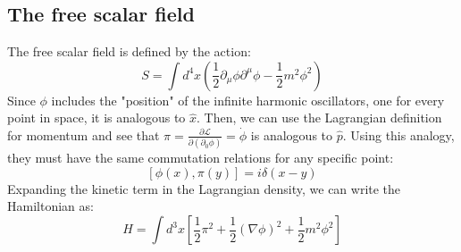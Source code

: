 \documentclass{article}
\begin{document}
\subsection{The free scalar field}
The free scalar field is defined by the action:
\begin{equation}
    S = \int d^4x \left(\frac{1}{2}\partial_\mu\phi \partial^\mu\phi - \frac{1}{2}m^2\phi^2\right)
\end{equation}
Since $\phi$ includes the "position" of the infinite harmonic oscillators, one for every point in space, it is analogous to $\hat{x}$. Then, we can use the Lagrangian definition for momentum and see that $\pi = \frac{\partial \mathcal{L}}{\partial (\partial_0\phi)} = \dot{\phi}$ is analogous to $\hat{p}$. Using this analogy, they must have the same commutation relations for any specific point:
\begin{equation}
    \left[\phi(x), \pi(y)\right] = i\delta(x - y)
\end{equation}
Expanding the kinetic term in the Lagrangian density, we can write the Hamiltonian as:
\begin{equation}
    H = \int d^3x \left[
        \frac{1}{2}\pi^2 + \frac{1}{2}\left(\nabla\phi\right)^2 + \frac{1}{2}m^2\phi^2 
    \right]
\end{equation}
\end{document}
